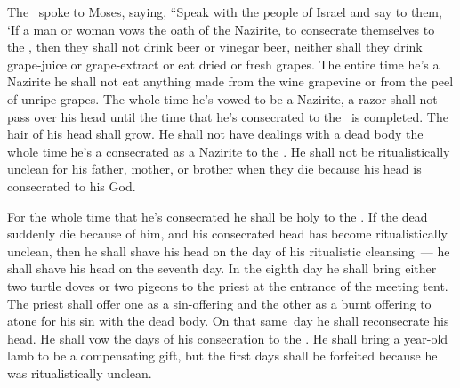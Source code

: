 
\begin{inparaenum}
   The \lord\ spoke to Moses, saying,%
   ``Speak with the people of Israel and say to them, `If a man or woman vows the oath of the Nazirite, to consecrate themselves to the \lord,%
   then they shall not drink beer or vinegar beer, neither shall they drink grape-juice or grape-extract or eat dried or fresh grapes.%
   The entire time he's a Nazirite he shall not eat anything made from the wine grapevine or from the peel of unripe grapes.%
   The whole time he's vowed to be a Nazirite, a razor shall not pass over his head until the time that he's consecrated to the \lord\ is completed. The hair of his head shall grow.%
   He shall not have dealings with a dead body the whole time he's a consecrated as a Nazirite to the \lord.%
   He shall not be ritualistically unclean for his father, mother, or brother when they die because his head is consecrated to his God.%

   For the whole time that he's consecrated he shall be holy to the \lord.%
   If the dead suddenly die because of him, and his consecrated head has become ritualistically unclean, then he shall shave his head on the day of his ritualistic cleansing~--- he shall shave his head on the seventh day.%
   In the eighth day he shall bring either two turtle doves or two pigeons to the priest at the entrance of the meeting tent.%
   The priest shall offer one as a sin-offering and the other as a burnt offering to atone for his sin with the dead body. On that same\understood{}\ day he shall reconsecrate his head.%
   He shall vow the days of his consecration to the \lord. He shall bring a year-old lamb to be a compensating gift, but the first days shall be forfeited because he was ritualistically unclean.%


\end{inparaenum}
